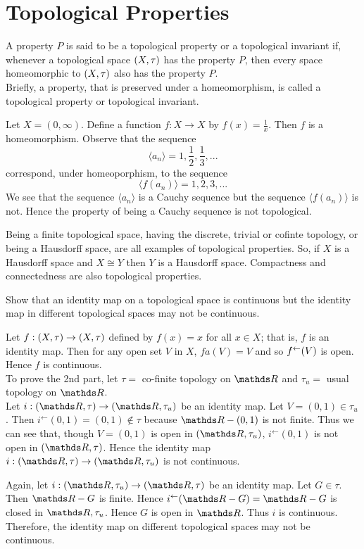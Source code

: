 \documentclass[../main-sheet.tex]{subfiles}
\begin{document}
\section{Topological Properties}
A property \(P\) is said to be a topological property or a topological invariant if, whenever a topological space \((X, \tau)\) has the property \(P\), then every space homeomorphic to \((X, \tau)\) also has the property    \(P\).\\
Briefly, a property, that is preserved under a homeomorphism, is called a topological property or topological invariant.
\begin{ex}
    Let \(X=(0,\infty)\). Define a function \(f:X\to X\) by \(f(x)=\frac{1}{x}\). Then \(f\) is a homeomorphism. Observe that the sequence
    \[\langle a_n\rangle=1,\frac{1}{2},\frac{1}{3},...\]
    correspond, under homeoporphism, to the sequence
    \[\langle f(a_n)\rangle=1,2,3,...\]
    We see that the sequence \(\langle a_n\rangle\) is a Cauchy sequence but the sequence \(\langle f(a_n)\rangle\) is not. Hence the property of being a Cauchy sequence is not topological.
\end{ex}
\begin{ex}
    Being a finite topological space, having the discrete, trivial or cofinte topology, or being a Hausdorff space, are all examples of topological properties. So, if \(X\) is a Hausdorff space and \(X\cong Y\) then \(Y\) is a Hausdorff space. Compactness and connectedness are also topological properties.
\end{ex}
\begin{prob}
    Show that an identity map on a topological space is continuous but the identity map in different topological spaces may not be continuous.
\end{prob}
\begin{soln}
    Let \(f:(X, \tau)\to (X, \tau)\) defined by \(f(x)=x\) for all \(x\in X\); that is, \(f\) is an identity map. Then for any open set \(V\) in \(X\), \(fa(V)=V\) and so \(f^{\leftarrow}(V)\) is open. Hence \(f\) is continuous.\\
    To prove the 2nd part, let \(\tau=\) co-finite topology on \(\R\) and \(\tau_u=\) usual topology on \(\R\).\\
    Let \(i:(\R,\tau)\to (\R,\tau_u)\) be an identity map. Let \(V=(0,1)\in \tau_u\). Then \(i^{\leftarrow}(0,1)=(0,1)\notin \tau\) because \(\R-(0,1)\) is not finite. Thus we can see that, though \(V=(0,1)\) is open in \((\R,\tau_u)\), \(i^{\leftarrow}(0,1)\) is not open in \((\R,\tau)\). Hence the identity map \(i:(\R,\tau)\to (\R,\tau_u)\) is not continuous.
    
    Again, let \(i:(\R,\tau_u)\to (\R,\tau)\) be an identity map. Let \(G\in \tau\). Then \(\R-G\) is finite. Hence \(i^{\leftarrow}(\R-G)=\R-G\) is closed in \(\R,\tau_u\). Hence \(G\) is open in \(\R\). Thus \(i\) is continuous.\\
    Therefore, the identity map on different topological spaces may not be continuous.
\end{soln}
\end{document}
